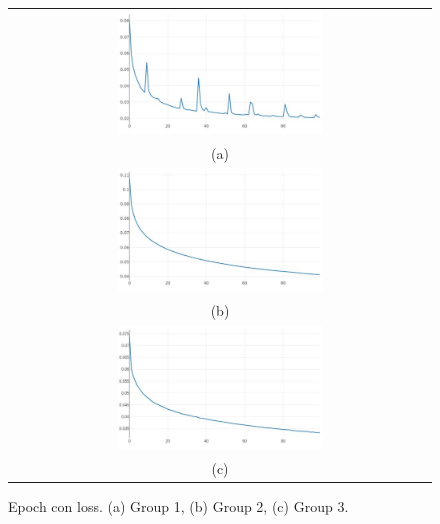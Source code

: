 \documentclass[10pt,twocolumn,letterpaper]{article}
\begin{document}
\begin{figure}%
\centering\begin{tabular}{c}
\includegraphics[width=0.5\textwidth]{fig14-a}\\
(a)\\[3ex]%
\includegraphics[width=0.5\textwidth]{fig14-b}\\
(b)\\[3ex]
\includegraphics[width=0.5\textwidth]{fig14-c}\\
(c)
\end{tabular}
\caption{Epoch con loss. (a) Group 1, (b) Group 2, (c) Group 3.}%
\label{fig14}%
\end{figure}
\end{document}

